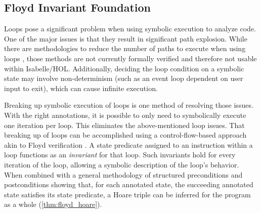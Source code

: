 \subsection{Floyd Invariant Foundation}\label{se:cfg_invariant}
Loops pose a significant problem when using symbolic execution to analyze code.%
One of the major issues is that they result in significant path explosion.%
While there are methodologies to reduce the number of paths to execute
when using loops \autocite{saxena2009lese,obdrzalek2011efficient},
those methods are not currently formally verified
and therefore not usable within Isabelle/HOL.
Additionally, deciding the loop condition on a symbolic state
may involve non-determinism (such as an event loop dependent on user input to exit),%
which can cause infinite execution.

Breaking up symbolic execution of loops is one method of resolving those issues.
With the right annotations,
it is possible to only need to symbolically execute one iteration per loop.
This eliminates the above-mentioned loop issues.
That breaking up of loops can be accomplished using a control-flow-based approach
akin to Floyd verification \autocite{floyd1967assigning}.%
A state predicate assigned to an instruction within a loop
functions as an \emph{invariant} for that loop.
Such invariants hold for every iteration of the loop,
allowing a symbolic description of the loop's behavior.
When combined with a general methodology
of structured preconditions and postconditions showing that,
for each annotated state, the succeeding annotated state satisfies its state predicate,
a Hoare triple can be inferred for the program as a whole (\cref{thm:floyd_hoare}).

